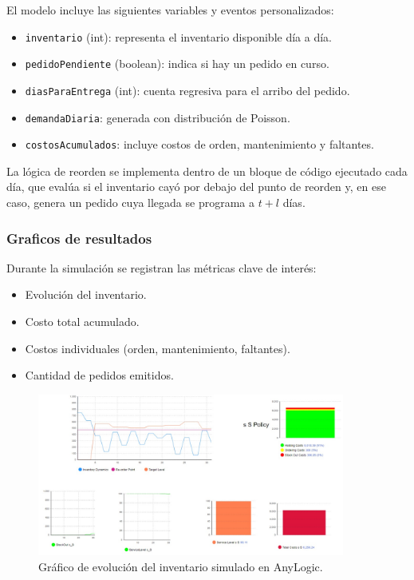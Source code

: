 \documentclass[12pt]{article}
\begin{document}
El modelo incluye las siguientes variables y eventos personalizados:

\begin{itemize}
    \item \texttt{inventario} (int): representa el inventario disponible día a día.
    \item \texttt{pedidoPendiente} (boolean): indica si hay un pedido en curso.
    \item \texttt{diasParaEntrega} (int): cuenta regresiva para el arribo del pedido.
    \item \texttt{demandaDiaria}: generada con distribución de Poisson.
    \item \texttt{costosAcumulados}: incluye costos de orden, mantenimiento y faltantes.
\end{itemize}

La lógica de reorden se implementa dentro de un bloque de código ejecutado cada día, que evalúa si el inventario cayó por debajo del punto de reorden y, en ese caso, genera un pedido cuya llegada se programa a \( t + l \) días.

\subsubsection*{Graficos de resultados}

Durante la simulación se registran las métricas clave de interés:

\begin{itemize}
    \item Evolución del inventario.
    \item Costo total acumulado.
    \item Costos individuales (orden, mantenimiento, faltantes).
    \item Cantidad de pedidos emitidos.
\end{itemize}

\begin{figure}[H]
    \centering
    \includegraphics[width=0.9\textwidth]{./graficas/modelos/inventario/evolucion.jpg}
    \caption{Gráfico de evolución del inventario simulado en AnyLogic.}
\end{figure}
\end{document}
